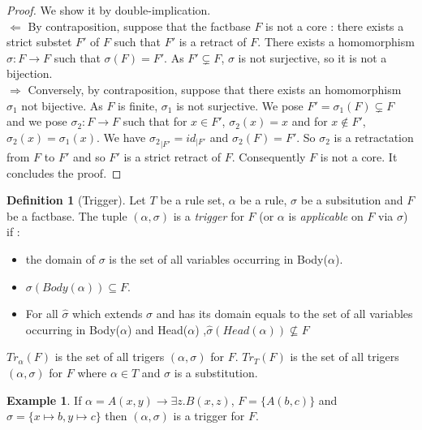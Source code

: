 \documentclass{article}
\theoremstyle{definition}
\newtheorem{definition}{Definition}[section]
\newtheorem{example}{Example}[section]
\theoremstyle{remark}
\begin{document}
\begin{proof}
We show it by double-implication. \\
$\boxed{\Leftarrow}$ By contraposition, suppose that the factbase $F$ is not a core : there exists a strict substet $F'$ of $F$ such that $F'$ is a retract of $F$. There exists a homomorphism $\sigma:F \to F$ such that $\sigma(F) = F'$. As $F' \subsetneq F$, $\sigma$ is not surjective, so it is not a bijection. \\
$\boxed{\Rightarrow}$ Conversely, by contraposition, suppose that there exists an homomorphism $\sigma_1$ not bijective. As $F$ is finite, $\sigma_1$ is not surjective. We pose $F' = \sigma_1(F)\subsetneq F$ and we pose $\sigma_2:F \to F$ such that for $x \in F'$, $\sigma_2(x) = x$ and for $x \notin F'$, $\sigma_2(x) = \sigma_1(x)$. We have ${\sigma_2}_{|F'} = id_{|F'}$ and $\sigma_2(F) = F'$. So $\sigma_2$ is a retractation from $F$ to $F'$ and so $F'$ is a strict retract of $F$. Consequently $F$ is not a core. It concludes the proof.
\end{proof}

\begin{definition}[Trigger]
Let $T$ be a rule set, $\alpha$ be a rule, $\sigma$ be a subsitution and $F$ be a factbase. The tuple $(\alpha,\sigma)$ is a \emph{trigger} for $F$ (or $\alpha$ is \emph{applicable} on $F$ via $\sigma$) if : 
\begin{itemize}
\item the domain of $\sigma$ is the set of all variables occurring in Body($\alpha$).
\item $\sigma(Body(\alpha)) \subseteq F$.
\item For all $\hat \sigma$ which extends $\sigma$ and has its domain equals to the set of all variables occurring in Body($\alpha$) and Head($\alpha$) ,$\hat \sigma(Head(\alpha)) \nsubseteq F$
\end{itemize}
\emph{$Tr_{\alpha}(F)$} is the set of all trigers $(\alpha,\sigma)$ for $F$. \emph{$Tr_{T}(F)$} is the set of all trigers $(\alpha,\sigma)$ for $F$ where $\alpha \in T$ and $\sigma$ is a substitution. 
\end{definition}

\begin{example}If $\alpha = A(x,y) \rightarrow \exists z.B(x,z)$, $F = \{A(b,c)\}$ and $\sigma = \{x \mapsto b, y \mapsto c \}$ then $(\alpha,\sigma)$ is a trigger for $F$.
\end{example}
\end{document}

